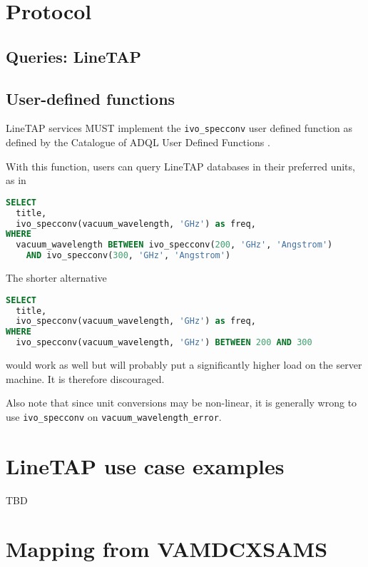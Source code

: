 \documentclass[11pt,a4paper]{ivoa}
\begin{document}
\section{Protocol}
\label{sec:Protocol}
\subsection{Queries: LineTAP}

\subsection{User-defined functions}

LineTAP services MUST implement the \texttt{ivo\_specconv} user defined
function as defined by the Catalogue of ADQL User Defined Functions
\citep{2021ivoa.spec.0310C}.

With this function, users can query LineTAP databases in their preferred
units, as in

\begin{lstlisting}[language=SQL]
SELECT 
  title,
  ivo_specconv(vacuum_wavelength, 'GHz') as freq,
WHERE
  vacuum_wavelength BETWEEN ivo_specconv(200, 'GHz', 'Angstrom') 
    AND ivo_specconv(300, 'GHz', 'Angstrom')
\end{lstlisting}

The shorter alternative

\begin{lstlisting}[language=SQL]
SELECT 
  title,
  ivo_specconv(vacuum_wavelength, 'GHz') as freq,
WHERE
  ivo_specconv(vacuum_wavelength, 'GHz') BETWEEN 200 AND 300
\end{lstlisting}

would work as well but will probably put a significantly higher load on
the server machine.  It is therefore discouraged.

Also note that since unit conversions may be non-linear, it is generally
wrong to use \texttt{ivo\_specconv} on
\texttt{vacuum\_wavelength\_error}.


\section{LineTAP use case examples}

TBD

\section{Mapping from VAMDCXSAMS}
\label{sect:mapping}
\end{document}
